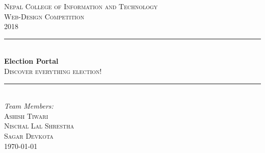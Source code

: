 \documentclass[12pt]{article}
\begin{document}
\begin{titlepage}

\newcommand{\HRule}{\rule{\linewidth}{0.5mm}} %

\center %
 

\textsc{\LARGE Nepal College of Information and Technology}\\[1.5cm] %
\textsc{\Large Web-Design Competition}\\[0.5cm] %
\textsc{\large 2018}\\[0.5cm] %


\HRule \\[0.4cm]
{ \huge \bfseries Election Portal}\\[0.4cm] %
\textsc{\large Discover everything election!}
\HRule \\[1.5cm]
 


\Large \emph{Team Members:}\\
\textsc{Ashish Tiwari}\\
\textsc{Nischal Lal Shrestha}\\
\textsc{Sagar Devkota}\\


{\large \today}\\[2cm] %


\end{titlepage}
\end{document}
